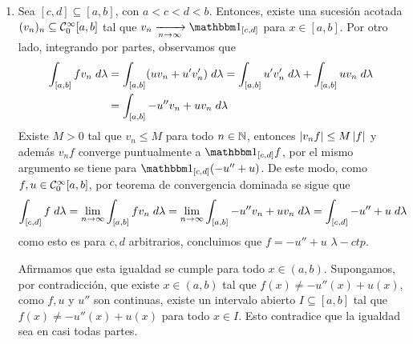 \documentclass{article}
\begin{document}
\begin{enumerate}
    \item Sea $[c,d]\subseteq[a,b]$, con $a<c<d<b$. Entonces, existe una sucesión acotada 
    $(v_{n})_{n}\subseteq\mathcal{C}_{0}^{\infty}[a,b]$ tal que $v_{n}\xrightarrow[n\to\infty]{}
    \I_{[c,d]}$ para $x\in[a,b]$. Por otro lado, integrando por partes, observamos que
    \begin{align*}
        \int_{[a,b]}fv_{n}\hspace{1mm}d\lambda &= \int_{[a,b]}(uv_{n}+u'v_{n}')\hspace{1mm}d\lambda
        =\int_{[a,b]}u'v_{n}'\hspace{1mm}d\lambda+\int_{[a,b]}uv_{n}\hspace{1mm}d\lambda \\
        &= \int_{[a,b]}-u''v_{n}+uv_{n}\hspace{1mm}d\lambda
    \end{align*}
    Existe $M>0$ tal que $v_{n}\leq M$ para todo $n\in\mathbb{N}$, entonces $\left|v_{n}f \right|\leq M\left|f \right|$ y 
    además $v_{n}f$ converge puntualmente a $\I_{[c,d]}f$, por el mismo argumento se tiene para 
    $\I_{[c,d]}(-u''+u)$. De este modo, como $f,u\in\mathcal{C}_{0}^{\infty}[a,b]$, por teorema de 
    convergencia dominada se sigue que
    \begin{equation*}
        \int_{[c,d]}f\hspace{1mm}d\lambda=\lim\limits_{n\to\infty}
        \int_{[a,b]}fv_{n}\hspace{1mm}d\lambda=\lim\limits_{n\to\infty}
        \int_{[a,b]}-u''v_{n}+uv_{n}\hspace{1mm}d\lambda=\int_{[c,d]}-u''+u\hspace{1mm}d\lambda
    \end{equation*}
    como esto es para $c,d$ arbitrarios, concluimos que $f=-u''+u$ $\lambda-ctp$. 
    
    Afirmamos que esta igualdad se cumple para todo $x\in(a,b)$. Supongamos, por contradicción, que 
    existe $x\in(a,b)$ tal que $f(x)\neq-u''(x)+u(x)$, como $f,u$ y $u''$ son continuas, existe 
    un intervalo abierto $I\subseteq[a,b]$ tal que $f(x)\neq-u''(x)+u(x)$ para todo $x\in I$. Esto
    contradice que la igualdad sea en casi todas partes.


\end{enumerate}
\end{document}
